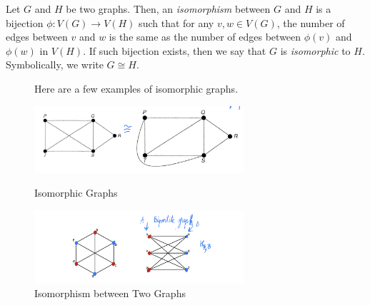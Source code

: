 \begin{definition}
  Let \(G\) and \(H\) be two graphs. Then, an \textit{isomorphism} between \(G\)
  and \(H\) is a bijection \(\phi : V(G) \to V(H)\) such that for any \(v, w \in
  V(G)\), the number of edges between \(v\) and \(w\) is the same as the number
  of edges between \(\phi(v)\) and \(\phi(w)\) in \(V(H)\). If such bijection
  exists, then we say that \(G\) is \textit{isomorphic} to \(H\). Symbolically, we write \(G \cong H\).
\end{definition}

\begin{figure}[ht]
\begin{nexample}
  Here are a few examples of isomorphic graphs.

    \begin{center}
      \includegraphics[width=0.69\textwidth]{figures/l01/isomorphic-graphs}
      \caption{Isomorphic Graphs}\label{fig:isomorphic-graphs}
    \end{center}

  \begin{center}
    \includegraphics[width=0.69\textwidth]{figures/l01/isomorphism-example}
    \caption{Isomorphism between Two Graphs}\label{fig:isomorphism-example}
  \end{center}
\end{nexample}
\end{figure}

